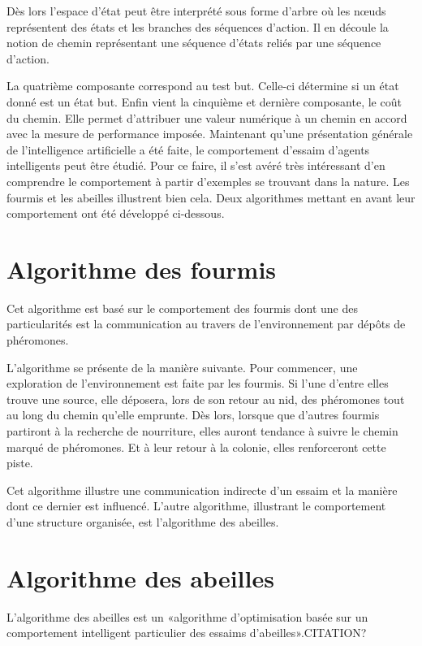 \documentclass[a4paper,11pt]{report}
\begin{document}
Dès lors l'espace d'état peut être interprété sous forme d'arbre où les nœuds représentent des états et les branches des séquences d'action. Il en découle la notion de chemin représentant une séquence d'états reliés par une séquence d'action.

La quatrième composante correspond au test but. Celle-ci détermine si un état donné est un état but. Enfin vient la cinquième et dernière composante, le coût du chemin. Elle permet d'attribuer une valeur numérique à un chemin en accord avec la mesure de performance imposée.
Maintenant qu'une présentation générale de l'intelligence artificielle a été faite, le comportement d'essaim d'agents intelligents peut être étudié. Pour ce faire, il s'est avéré très intéressant d'en comprendre le comportement à partir d'exemples se trouvant dans la nature. Les fourmis et les abeilles illustrent bien cela. Deux algorithmes mettant en avant leur comportement ont été développé ci-dessous.

\section{Algorithme des fourmis}

Cet algorithme est basé sur le comportement des fourmis dont une des particularités est la communication au travers de l'environnement par dépôts de phéromones.

L'algorithme se présente de la manière suivante. Pour commencer, une exploration de l'environnement est faite par les fourmis. Si l'une d'entre elles trouve une source, elle déposera, lors de son retour au nid, des phéromones tout au long du chemin qu'elle emprunte. Dès lors, lorsque que d'autres fourmis partiront à la recherche de nourriture, elles auront tendance à suivre le chemin  marqué de phéromones. Et à leur retour à la colonie, elles renforceront cette piste.\cite{wikiFourmi}

Cet algorithme illustre une communication indirecte d'un essaim et la manière dont ce dernier est influencé.\cite{communicationFourmis} L'autre algorithme, illustrant le comportement d'une structure organisée, est l'algorithme des abeilles.

\section{Algorithme des abeilles}

L'algorithme des abeilles est un «algorithme d'optimisation basée sur un comportement intelligent particulier des essaims d'abeilles».CITATION?
\end{document}
